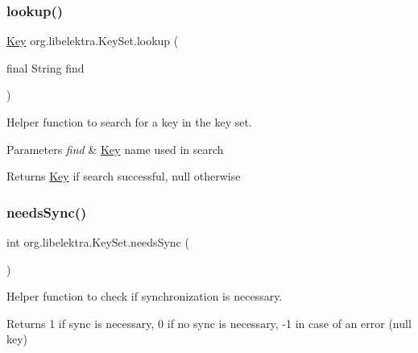 \subsubsection{\texorpdfstring{lookup()}{lookup()}\hspace{0.1cm}{\footnotesize\ttfamily [4/4]}}
{\footnotesize\ttfamily \hyperlink{classorg_1_1libelektra_1_1Key}{Key} org.\+libelektra.\+Key\+Set.\+lookup (\begin{DoxyParamCaption}\item[{final String}]{find }\end{DoxyParamCaption})\hspace{0.3cm}{\ttfamily [inline]}}



Helper function to search for a key in the key set. 


\begin{DoxyParams}{Parameters}
{\em find} & \hyperlink{classorg_1_1libelektra_1_1Key}{Key} name used in search \\
\hline
\end{DoxyParams}
\begin{DoxyReturn}{Returns}
\hyperlink{classorg_1_1libelektra_1_1Key}{Key} if search successful, null otherwise 
\end{DoxyReturn}
\mbox{\label{classorg_1_1libelektra_1_1KeySet_a9a21c729da19bc6fb2e7f33fe06ee15e}} 
\subsubsection{\texorpdfstring{needs\+Sync()}{needsSync()}}
{\footnotesize\ttfamily int org.\+libelektra.\+Key\+Set.\+needs\+Sync (\begin{DoxyParamCaption}{ }\end{DoxyParamCaption})\hspace{0.3cm}{\ttfamily [inline]}}



Helper function to check if synchronization is necessary. 

\begin{DoxyReturn}{Returns}
1 if sync is necessary, 0 if no sync is necessary, -\/1 in case of an error (null key) 
\end{DoxyReturn}
\mbox{\label{classorg_1_1libelektra_1_1KeySet_a92aa593320132e4272602dda29aee2c7}} 

